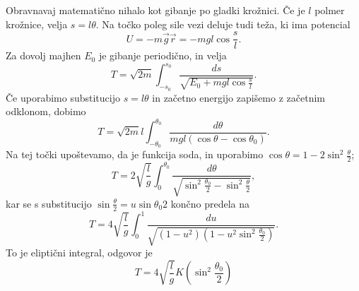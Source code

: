 
\begin{vo}{Obravnavaj matematično nihalo kot gibanje po gladki krožnici.}
  Če je $l$ polmer krožnice, velja $s = l \theta$.
  Na točko poleg sile vezi deluje tudi teža, ki ima potencial
  \[
	U = - m \vec{g} \vec{r} = - m g l \cos \frac{s}{l}.
  \]
  Za dovolj majhen $E_0$ je gibanje periodično, in velja
  \[
	T = \sqrt{2m} \int_{-s_0}^{s_0} \frac{ds}{\sqrt{E_0 + mgl \cos
		\frac{s}{l}}}.
  \]
  Če uporabimo substitucijo $s = l \theta$ in začetno energijo zapišemo z
  začetnim odklonom, dobimo
  \[
	T = \sqrt{2m} l \int_{-\theta_0}^{\theta_0} \frac{d\theta}{mgl(\cos \theta -
	  \cos \theta_0)}.
  \]
  Na tej točki upoštevamo, da je funkcija soda, in uporabimo $\cos \theta = 1 -
  2 \sin^2 \frac{\theta}{2}$;
  \[
	T = 2 \sqrt{\frac{l}{g}} \int_0^{\theta_0} \frac{d\theta}{\sqrt{ \sin^2
		\frac{\theta_0}{2} - \sin^2 \frac{\theta}{2} }},
  \]
  kar se s substitucijo $\sin \frac{\theta}{2} = u \sin{\theta_0}{2}$ končno
  predela na
  \[
	 T = 4 \sqrt{\frac{l}{g}} \int_0^1 \frac{du}{\sqrt{ (1-u^2) (1 - u^2 \sin^2
		\frac{\theta_0}{2}) }}.
  \]
  To je eliptični integral, odgovor je
  \[
	T = 4 \sqrt{\frac{l}{g}} K\left( \sin^2 \frac{\theta_0}{2} \right)
  \]
\end{vo}

